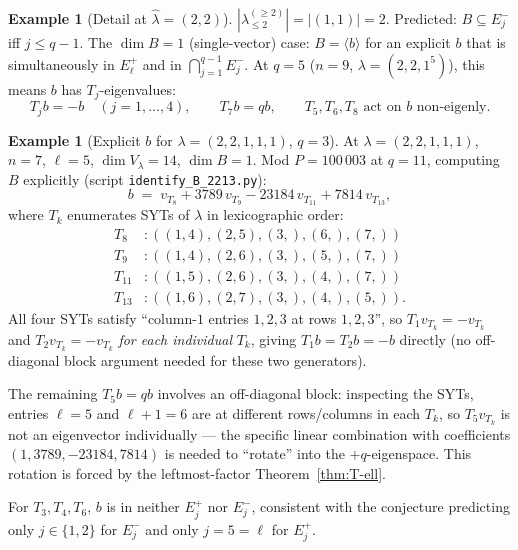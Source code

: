 \documentclass[11pt]{article}
\theoremstyle{definition}
\newtheorem{example}[theorem]{Example}
\newcommand{\hatl}{\widehat\lambda}
\newcommand{\decl}{\lambda^{(\ge 2)}}
\newcommand{\decltwo}{\decl_{\le 2}}
\begin{document}
\begin{example}[Detail at $\hatl = (2, 2)$]\label{ex:22}
$|\decltwo| = |(1, 1)| = 2$.  Predicted: $B \subseteq E_j^-$ iff
$j \le q - 1$.  The $\dim B = 1$ (single-vector) case: $B = \langle b \rangle$
for an explicit $b$ that is simultaneously in $E_\ell^+$ and in
$\bigcap_{j=1}^{q - 1} E_j^-$.  At $q = 5$ ($n = 9$, $\lambda = (2, 2, 1^5)$),
this means $b$ has $T_j$-eigenvalues:
\[
   T_j b = -b \quad (j = 1, \ldots, 4), \qquad
   T_7 b = q b, \qquad
   T_5, T_6, T_8 \text{ act on } b \text{ non-eigenly.}
\]
\end{example}

\begin{example}[Explicit $b$ for $\lambda = (2, 2, 1, 1, 1)$, $q = 3$]\label{ex:22-explicit}
At $\lambda = (2, 2, 1, 1, 1)$, $n = 7$, $\ell = 5$, $\dim V_\lambda = 14$,
$\dim B = 1$.  Mod $P = 100\,003$ at $q = 11$, computing $B$ explicitly
(script \texttt{identify\_B\_2213.py}):
\[
   b \;=\; v_{T_8} + 3789\, v_{T_9} - 23184\, v_{T_{11}} + 7814\, v_{T_{13}},
\]
where $T_k$ enumerates SYTs of $\lambda$ in lexicographic order:
\begin{align*}
T_8    &: ((1{,}4),(2{,}5),(3{,}),(6{,}),(7{,})) \\
T_9    &: ((1{,}4),(2{,}6),(3{,}),(5{,}),(7{,})) \\
T_{11} &: ((1{,}5),(2{,}6),(3{,}),(4{,}),(7{,})) \\
T_{13} &: ((1{,}6),(2{,}7),(3{,}),(4{,}),(5{,})).
\end{align*}
All four SYTs satisfy ``column-$1$ entries $1, 2, 3$ at rows $1, 2, 3$'',
so $T_1 v_{T_k} = -v_{T_k}$ and $T_2 v_{T_k} = -v_{T_k}$ \emph{for
each individual} $T_k$, giving $T_1 b = T_2 b = -b$ directly (no
off-diagonal block argument needed for these two generators).

The remaining $T_5 b = q b$ involves an off-diagonal block:
inspecting the SYTs, entries $\ell = 5$ and $\ell + 1 = 6$ are at
different rows/columns in each $T_k$, so $T_5 v_{T_k}$ is not an
eigenvector individually --- the specific linear combination with
coefficients $(1, 3789, -23184, 7814)$ is needed to ``rotate'' into
the $+q$-eigenspace.  This rotation is forced by the leftmost-factor
Theorem~\ref{thm:T-ell}.

For $T_3, T_4, T_6$, $b$ is in neither $E_j^+$ nor $E_j^-$, consistent
with the conjecture predicting only $j \in \{1, 2\}$ for $E_j^-$
and only $j = 5 = \ell$ for $E_j^+$.
\end{example}
\end{document}
